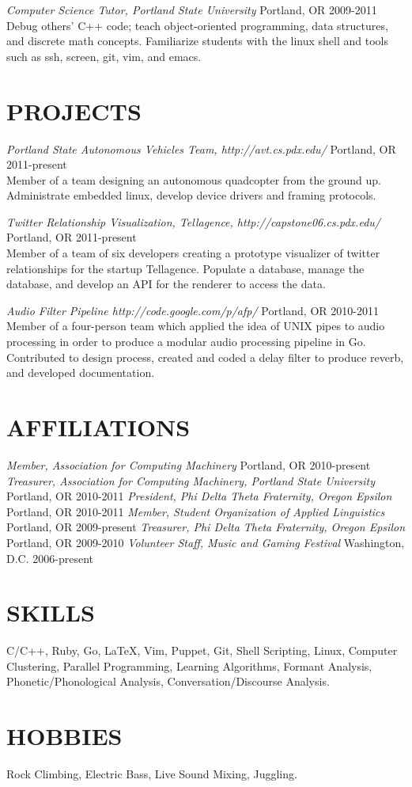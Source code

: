 \documentclass[margin]{res}
\begin{document}
\begin{resume}
{\sl Computer Science Tutor, Portland State University} \hfill Portland, OR 2009-2011\\
Debug others' C++ code; teach object-oriented programming, data structures, and discrete math concepts. Familiarize students with the linux shell and tools such as ssh, screen, git, vim, and emacs.

\section{PROJECTS} 

{\sl Portland State Autonomous Vehicles Team, http://avt.cs.pdx.edu/} \hfill Portland, OR 2011-present\\
Member of a team designing an autonomous quadcopter from the ground up. Administrate embedded linux, develop device drivers and framing protocols.

{\sl Twitter Relationship Visualization, Tellagence, http://capstone06.cs.pdx.edu/} \hfill Portland, OR 2011-present\\
Member of a team of six developers creating a prototype visualizer of twitter relationships for the startup Tellagence. Populate a database, manage the database, and develop an API for the renderer to access the data.

{\sl Audio Filter Pipeline http://code.google.com/p/afp/} \hfill Portland, OR 2010-2011\\
Member of a four-person team which applied the idea of UNIX pipes to audio processing in order to produce a modular audio processing pipeline in Go. Contributed to design process, created and coded a delay filter to produce reverb, and developed documentation.

\section{AFFILIATIONS}

{\sl Member, Association for Computing Machinery} \hfill Portland, OR 2010-present
{\sl Treasurer, Association for Computing Machinery, Portland State University} \hfill Portland, OR 2010-2011
{\sl President, Phi Delta Theta Fraternity, Oregon Epsilon} \hfill Portland, OR 2010-2011
{\sl Member, Student Organization of Applied Linguistics} \hfill Portland, OR 2009-present
{\sl Treasurer, Phi Delta Theta Fraternity, Oregon Epsilon} \hfill Portland, OR 2009-2010
{\sl Volunteer Staff, Music and Gaming Festival} \hfill Washington, D.C. 2006-present

\section{SKILLS} 
C/C++, Ruby, Go, LaTeX, Vim, Puppet, Git, Shell Scripting, Linux, Computer Clustering, Parallel Programming, Learning Algorithms, Formant Analysis, Phonetic/Phonological Analysis, Conversation/Discourse Analysis.

\section{HOBBIES} 
Rock Climbing, Electric Bass, Live Sound Mixing, Juggling.

\end{resume}
\end{document}

